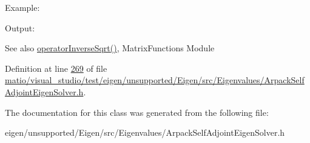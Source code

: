 Example\+: 
\begin{DoxyCodeInclude}
\end{DoxyCodeInclude}
 Output\+: 
\begin{DoxyVerbInclude}
\end{DoxyVerbInclude}


\begin{DoxySeeAlso}{See also}
\hyperlink{class_eigen_1_1_arpack_generalized_self_adjoint_eigen_solver_ad55f052b675f1deaea220d0cc225622a}{operator\+Inverse\+Sqrt()}, Matrix\+Functions Module 
\end{DoxySeeAlso}


Definition at line \hyperlink{matio_2visual__studio_2test_2eigen_2unsupported_2_eigen_2src_2_eigenvalues_2_arpack_self_adjoint_eigen_solver_8h_source_l00269}{269} of file \hyperlink{matio_2visual__studio_2test_2eigen_2unsupported_2_eigen_2src_2_eigenvalues_2_arpack_self_adjoint_eigen_solver_8h_source}{matio/visual\+\_\+studio/test/eigen/unsupported/\+Eigen/src/\+Eigenvalues/\+Arpack\+Self\+Adjoint\+Eigen\+Solver.\+h}.



The documentation for this class was generated from the following file\+:\begin{DoxyCompactItemize}
\item 
eigen/unsupported/\+Eigen/src/\+Eigenvalues/\+Arpack\+Self\+Adjoint\+Eigen\+Solver.\+h\end{DoxyCompactItemize}
